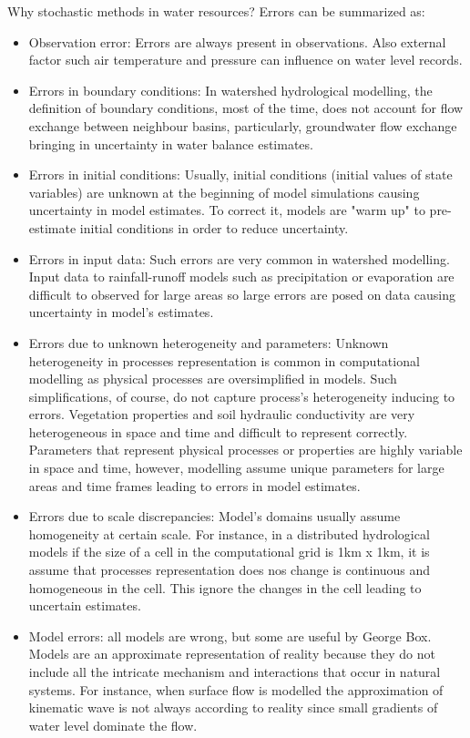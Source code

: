 \documentclass[8pt]{beamer}
\renewcommand{\emph}[1]{\textcolor{myorange}{#1}}
\begin{document}
\begin{frame}{Why stochastic methods in water resources?}
    Errors  can be summarized as:
    \begin{itemize} 
        \small
        \item \alert{Observation error}: Errors are always present in observations. Also external factor such air temperature and pressure can influence on water level records.
        \item \alert{Errors in boundary conditions}: In watershed hydrological modelling, the definition of boundary conditions,  most of the time,  does not account for flow exchange between neighbour basins, particularly, groundwater flow exchange bringing in uncertainty in water balance estimates. 
        \item \alert{Errors in initial conditions}: Usually, initial conditions (initial values of state variables) are unknown at the beginning of model simulations causing uncertainty in model estimates. To correct it, models are "warm up" to pre-estimate initial conditions in order to reduce uncertainty.
        \item \alert{Errors in input data}: Such errors are very common in watershed modelling. Input data to rainfall-runoff models such as precipitation or evaporation are difficult to observed for large areas so large errors are posed on data causing uncertainty in model's estimates.  
        \item \alert{Errors due to unknown heterogeneity and parameters}: Unknown heterogeneity in processes representation is common in computational modelling as physical processes are oversimplified in models. Such simplifications, of course, do not capture process's heterogeneity inducing to errors. Vegetation properties and soil hydraulic conductivity are very heterogeneous in space and time and difficult to represent correctly. Parameters that represent physical processes or properties are highly variable in space and time, however, modelling assume unique parameters for large areas and time frames leading to errors in model estimates. 
        \item \alert{Errors due to scale discrepancies}: Model's domains usually assume homogeneity at certain scale. For instance, in a distributed hydrological models if the size of a cell in the computational grid is 1km x 1km, it is assume that processes representation does nos change is continuous and homogeneous in the cell. This ignore the changes in the cell leading to uncertain estimates. 
        \item \alert{Model errors}: \emph{all models are wrong, but some are useful} by George Box. Models are an approximate representation of reality because they do not include all the intricate mechanism and interactions that occur in natural systems. For instance, when surface flow is modelled the approximation of kinematic wave is not always according to reality since small gradients of water level dominate the flow. 
    \end{itemize} 
\end{frame}
\end{document}
